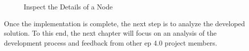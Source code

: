     \begin{figure}[h]
    \centering
    \caption{\label{fig:proto-demo-detail}  Inspect the Details of a Node}
    \end{figure}


Once the implementation is complete, the next step is to analyze the developed solution. To this end, the next chapter will focus on an analysis of the development process and feedback from other \acrshort{ep} 4.0 project members.
    